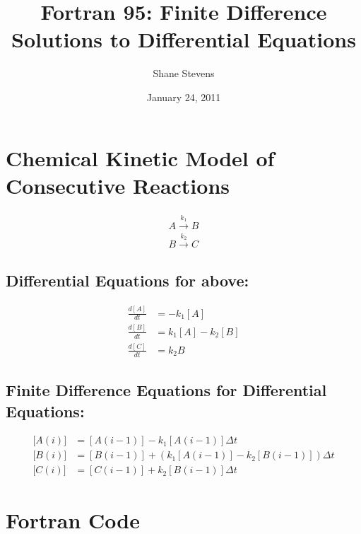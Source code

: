\documentclass[10pt]{article}\usepackage{graphicx, color}
\title{Fortran 95: Finite Difference Solutions to Differential Equations}
\author{Shane Stevens}
\date{January 24, 2011}
\begin{document}
\maketitle

\tableofcontents

\listoffigures




\section{Chemical Kinetic Model of Consecutive Reactions}

\begin{eqnarray}
A \xrightarrow{k_1} B \\    
B \xrightarrow{k_2} C
\end{eqnarray}

\subsection{Differential Equations for above:}


\begin{eqnarray}
\frac{d[A]}{dt} & = -k_1[A] \\
\frac{d[B]}{dt} & = k_1[A] -k_2[B] \\
\frac{d[C]}{dt} & = k_2B
\end{eqnarray}


\subsection{Finite Difference Equations for Differential Equations:}


\begin{eqnarray}
\lbrack A(i) \rbrack & = [A(i-1)] -k_1[A(i-1)]\Delta t \\
\lbrack B(i)] & = [B(i-1)]+(k_1[A(i-1)]-k_2[B(i-1)]) \Delta t \\
\lbrack C(i)] & = [C(i-1)] + k_2[B(i-1)] \Delta t
\end{eqnarray}


\section{Fortran Code}
\end{document}
